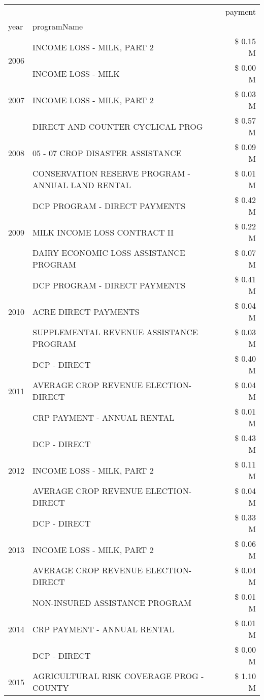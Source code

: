 \begin{tabular}{llr}
\toprule
 &  & payment \\
year & programName &  \\
\midrule
\multirow[t]{2}{*}{2006} & INCOME LOSS - MILK, PART 2 & \$ 0.15 M \\
 & INCOME LOSS - MILK & \$ 0.00 M \\
\cline{1-3}
2007 & INCOME LOSS - MILK, PART 2 & \$ 0.03 M \\
\cline{1-3}
\multirow[t]{3}{*}{2008} & DIRECT AND COUNTER CYCLICAL PROG & \$ 0.57 M \\
 & 05 - 07 CROP DISASTER ASSISTANCE & \$ 0.09 M \\
 & CONSERVATION RESERVE PROGRAM - ANNUAL LAND RENTAL & \$ 0.01 M \\
\cline{1-3}
\multirow[t]{3}{*}{2009} & DCP PROGRAM - DIRECT PAYMENTS & \$ 0.42 M \\
 & MILK INCOME LOSS CONTRACT II & \$ 0.22 M \\
 & DAIRY ECONOMIC LOSS ASSISTANCE PROGRAM & \$ 0.07 M \\
\cline{1-3}
\multirow[t]{3}{*}{2010} & DCP PROGRAM - DIRECT PAYMENTS & \$ 0.41 M \\
 & ACRE DIRECT PAYMENTS & \$ 0.04 M \\
 & SUPPLEMENTAL REVENUE ASSISTANCE PROGRAM & \$ 0.03 M \\
\cline{1-3}
\multirow[t]{3}{*}{2011} & DCP - DIRECT & \$ 0.40 M \\
 & AVERAGE CROP REVENUE ELECTION-DIRECT & \$ 0.04 M \\
 & CRP PAYMENT - ANNUAL RENTAL & \$ 0.01 M \\
\cline{1-3}
\multirow[t]{3}{*}{2012} & DCP - DIRECT & \$ 0.43 M \\
 & INCOME LOSS - MILK, PART 2 & \$ 0.11 M \\
 & AVERAGE CROP REVENUE ELECTION-DIRECT & \$ 0.04 M \\
\cline{1-3}
\multirow[t]{3}{*}{2013} & DCP - DIRECT & \$ 0.33 M \\
 & INCOME LOSS - MILK, PART 2 & \$ 0.06 M \\
 & AVERAGE CROP REVENUE ELECTION-DIRECT & \$ 0.04 M \\
\cline{1-3}
\multirow[t]{3}{*}{2014} & NON-INSURED ASSISTANCE PROGRAM & \$ 0.01 M \\
 & CRP PAYMENT - ANNUAL RENTAL & \$ 0.01 M \\
 & DCP - DIRECT & \$ 0.00 M \\
\cline{1-3}
\multirow[t]{3}{*}{2015} & AGRICULTURAL RISK COVERAGE PROG - COUNTY & \$ 1.10 M \\

\end{tabular}
